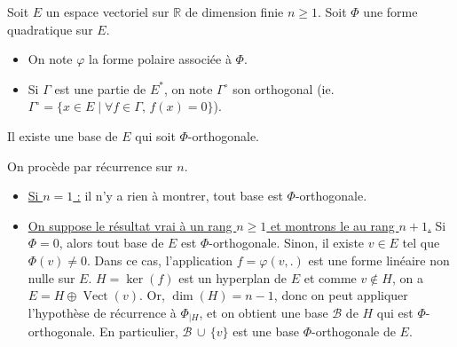 




	Soit $E$ un espace vectoriel sur $\mathbb{R}$ de dimension finie $n \geq 1$. Soit $\Phi$ une forme quadratique sur $E$.

	\medskip

	\begin{notation}
		\begin{itemize}
			\item On note $\varphi$ la forme polaire associée à $\Phi$.
			\item Si $\Gamma$ est une partie de $E^*$, on note $\Gamma^\circ$ son orthogonal (ie. $\Gamma^\circ = \{ x \in E \mid \forall f \in \Gamma, \, f(x) = 0 \}$).
		\end{itemize}
	\end{notation}


	\begin{lemma}
		\label{loi-d-inertie-de-sylvester-1}
		Il existe une base de $E$ qui soit $\Phi$-orthogonale.
	\end{lemma}

	\begin{demonstration}
		On procède par récurrence sur $n$.
		\begin{itemize}
			\item \uline{Si $n = 1$ :} il n'y a rien à montrer, tout base est $\Phi$-orthogonale.
			\item \uline{On suppose le résultat vrai à un rang $n \geq 1$ et montrons le au rang $n + 1$.} Si $\Phi = 0$, alors tout base de $E$ est $\Phi$-orthogonale. Sinon, il existe $v \in E$ tel que $\Phi(v) \neq 0$. Dans ce cas, l'application $f = \varphi(v, .)$ est une forme linéaire non nulle sur $E$.
			\newpar
			$H = \ker(f)$ est un hyperplan de $E$ et comme $v \notin H$, on a $E = H \oplus \operatorname{Vect}(v)$. Or, $\dim(H) = n-1$, donc on peut appliquer l'hypothèse de récurrence à $\Phi_{|H}$, et on obtient une base $\mathcal{B}$ de $H$ qui est $\Phi$-orthogonale. En particulier, $\mathcal{B} \, \cup \, \{ v \}$ est une base $\Phi$-orthogonale de $E$.
		\end{itemize}
	\end{demonstration}

